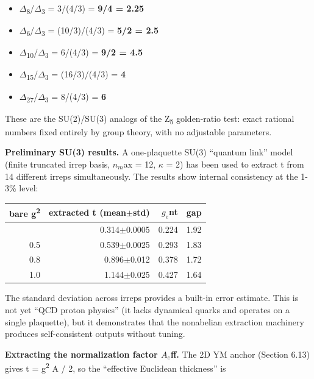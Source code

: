 \documentclass[11pt,a4paper]{article}
\theoremstyle{remark}
\providecommand{\tightlist}{%
  \setlength{\itemsep}{0pt}\setlength{\parskip}{0pt}}
\begin{document}
\begin{itemize}
\tightlist
\item
  \ensuremath{\Delta}\textsubscript{8}/\ensuremath{\Delta}\textsubscript{3} = 3/(4/3) = \textbf{9/4 = 2.25}
\item
  \ensuremath{\Delta}\textsubscript{6}/\ensuremath{\Delta}\textsubscript{3} = (10/3)/(4/3) = \textbf{5/2 = 2.5}
\item
  \ensuremath{\Delta}\textsubscript{10}/\ensuremath{\Delta}\textsubscript{3} = 6/(4/3) = \textbf{9/2 = 4.5}
\item
  \ensuremath{\Delta}\textsubscript{15}/\ensuremath{\Delta}\textsubscript{3} = (16/3)/(4/3) = \textbf{4}
\item
  \ensuremath{\Delta}\textsubscript{27}/\ensuremath{\Delta}\textsubscript{3} = 8/(4/3) = \textbf{6}
\end{itemize}

These are the SU(2)/SU(3) analogs of the Z\textsubscript{5} golden-ratio test: exact
rational numbers fixed entirely by group theory, with no adjustable parameters.

\textbf{Preliminary SU(3) results.} A one-plaquette SU(3) ``quantum link'' model
(finite truncated irrep basis, \(n_m\)ax = 12, \ensuremath{\kappa} = 2) has been used to
extract t from 14 different irreps simultaneously. The results show internal
consistency at the 1-3\% level:

{\def\LTcaptype{none} %
\begin{longtable}[]{@{}rrrr@{}}
\toprule\noalign{}
bare g\textsuperscript{2} & extracted t (mean\ensuremath{\pm}std) & \(g_e\)nt & gap \\
\midrule\noalign{}
\endhead
\bottomrule\noalign{}
\endlastfoot
0.3 & 0.314\ensuremath{\pm}0.0005 & 0.224 & 1.92 \\
0.5 & 0.539\ensuremath{\pm}0.0025 & 0.293 & 1.83 \\
0.8 & 0.896\ensuremath{\pm}0.012 & 0.378 & 1.72 \\
1.0 & 1.144\ensuremath{\pm}0.025 & 0.427 & 1.64 \\
\end{longtable}
}

The standard deviation across irreps provides a built-in error estimate. This is
not yet ``QCD proton physics'' (it lacks dynamical quarks and operates on a single
plaquette), but it demonstrates that the nonabelian extraction machinery produces
self-consistent outputs without tuning.

\textbf{Extracting the normalization factor \(A_e\)ff.} The 2D YM anchor
(Section 6.13) gives t = g\textsuperscript{2} A / 2, so the ``effective Euclidean thickness'' is
\end{document}
